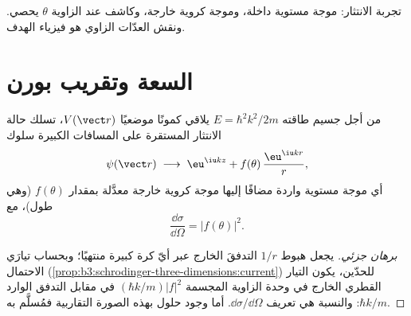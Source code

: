 \begin{omfigure}

{\small تجربة الانتثار: موجة مستوية داخلة، وموجة كروية
خارجة، وكاشف عند الزاوية $\theta$ يحصي. ونقش
العدّات الزاوي هو فيزياء الهدف.}
\end{omfigure}

\section{السعة وتقريب بورن}

\begin{theorem}\label{thm:b3:scattering-theory:amplitude}
من أجل جسيم طاقته $E = \hbar^2k^2/2m$ يلاقي كمونًا
موضعيًا $V(\vect r)$، تسلك حالة الانتثار المستقرة على المسافات
الكبيرة سلوك
\[
\psi(\vect r) \;\longrightarrow\;
\eu^{\iu kz} + f(\theta)\,\frac{\eu^{\iu kr}}{r} ,
\]
أي موجة مستوية واردة مضافًا إليها موجة كروية خارجة معدَّلة
بمقدار \emph{} $f(\theta)$ (وهي طول)، مع
\[
\frac{\dd\sigma}{\dd\Omega} = |f(\theta)|^2 .
\]
\end{theorem}

\begin{proof}[برهان جزئي]
يجعل هبوط $1/r$ التدفقَ الخارج عبر أيّ كرة كبيرة
منتهيًا؛ وبحساب تيارَي الاحتمال
(\cref{prop:b3:schrodinger-three-dimensions:current}) للحدّين،
يكون التيار القطري الخارج في وحدة الزاوية المجسمة
$(\hbar k/m)|f|^2$ في مقابل التدفق الوارد $\hbar k/m$: والنسبة
هي تعريف $\dd\sigma/\dd\Omega$. أما وجود حلول بهذه
الصورة التقاربية فمُسلَّم به.
\end{proof}

